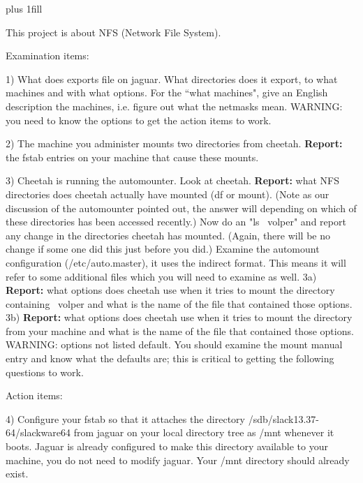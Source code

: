 
\rightskip=0pt plus 1fill

\parindent 0pt

This project is about NFS (Network File System).

Examination items:

1) What does {\ltt{}exports} file on {\ltt{}jaguar}.
What directories does it export, to what machines and with what options.
For the ``what machines", give an English description the machines, i.e.
figure out what the netmasks mean.
WARNING: you need to know the options to get the action items to work.

2) The machine you administer mounts two directories from cheetah.
{\bf Report:} the fstab entries on your machine that cause these mounts.

3) Cheetah is running the automounter.
Look at cheetah. 
{\bf Report:} what NFS directories does cheetah actually have mounted 
({\ltt{}df} or {\ltt{}mount}).
(Note as our discussion of the automounter pointed out, the answer will
depending on which of these directories has been accessed recently.)
Now do an "{\ltt{}ls ~volper}" and report any change in the directories
cheetah has mounted. (Again, there will be no change if some
one did this just before you did.)
Examine the automount configuration ({\ltt{}/etc/auto.master}), it
uses the indirect format.
This means it will refer to some additional files which you will need to
examine as well.
3a) {\bf Report:} what options does cheetah use when it tries to mount the
directory containing {\ltt{}~volper} and what is the name of the file
that contained those options.
3b) {\bf Report:} what options does cheetah use when it tries to mount the
directory from your machine and what is the name of the file
that contained those options.
WARNING: options not listed default.
You should examine the {\ltt{}mount}
manual entry and know what the defaults are;
this is critical to getting the following questions to work.

Action items:

4) Configure your fstab so that it attaches the directory
{\ltt{}/sdb/slack13.37-64/slackware64} from jaguar on your local directory tree
as {\ltt{}/mnt} whenever it boots.
Jaguar is already configured to make this directory available to your
machine, you do not need to modify jaguar.
Your {\ltt{}/mnt} directory should already exist.

